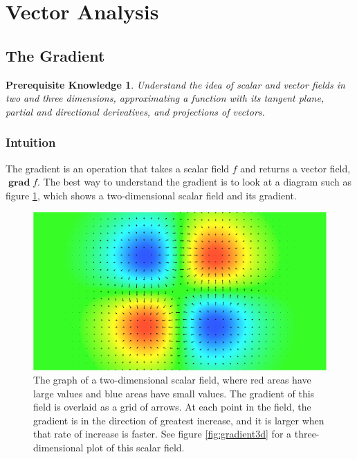 \documentclass{myarticle}
\DeclareMathOperator{\grad}{\mathbf{grad}}
\theoremstyle{nospace}
\newtheorem*{oldprereq}{Prerequisite Knowledge}
\newenvironment{prereq}
{\begin{mdframed}\begin{oldprereq}}
    {\end{oldprereq}\end{mdframed}}
\newtheorem{old series theorem}{Theorem}
\newenvironment{series theorem}
{\begin{mdframed}\begin{old series theorem}}
    {\end{old series theorem}\end{mdframed}}
\begin{document}
\section{Vector Analysis}
\label{sec:vector analysis}

\subsection{The Gradient}
\label{sec:gradient}

\begin{prereq}
  Understand the idea of scalar and vector fields in two and three
  dimensions, approximating a function with its tangent plane, partial
  and directional derivatives, and projections of vectors.
\end{prereq}

\subsubsection{Intuition}
\label{sec:gradient intuition}

The gradient is an operation that takes a scalar field $f$ and returns
a vector field, $\grad f$. The best way to understand the gradient is
to look at a diagram such as figure \ref{fig:gradient2d}, which shows
a two-dimensional scalar field and its gradient.

\begin{figure}[htb!] \centering

  \includegraphics[width=12cm]{data/gradient2d.pdf}

  \caption{The graph of a two-dimensional scalar field, where red
    areas have large values and blue areas have small values. The
    gradient of this field is overlaid as a grid of arrows. At each
    point in the field, the gradient is in the direction of greatest
    increase, and it is larger when that rate of increase is faster.
    See figure \ref{fig:gradient3d} for a three-dimensional plot of
    this scalar field.}
  \label{fig:gradient2d}
\end{figure}
\end{document}
